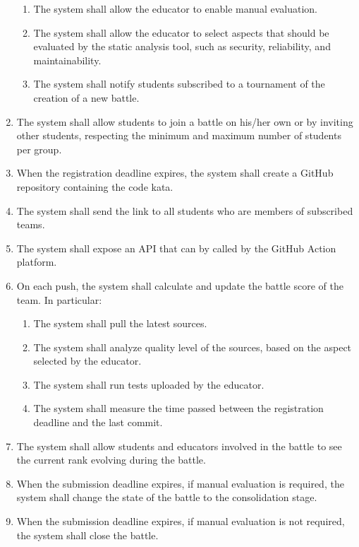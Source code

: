 \begin{enumerate}[label=\textbf{R\arabic*}:,leftmargin=1.3cm]
\begin{enumerate}[label=\textbf{R\arabic{enumi}.\arabic*}:, leftmargin=*]
              \item The system shall allow the educator to enable manual evaluation.
              \item The system shall allow the educator to select aspects that should be evaluated by the static analysis tool, such as security, reliability, and maintainability.
              \item The system shall notify students subscribed to a tournament of the creation of a new battle.
          \end{enumerate}
    \item The system shall allow students to join a battle on his/her own or by inviting other students, respecting the minimum and maximum number of students per group.
    \item When the registration deadline expires, the system shall create a GitHub repository containing the code kata.
    \item The system shall send the link to all students who are members of subscribed teams.
    \item The system shall expose an API that can by called by the GitHub Action platform.
    \item On each push, the system shall calculate and update the battle score of the team. In particular: 
          \begin{enumerate}[label=\textbf{R\arabic{enumi}.\arabic*}:, leftmargin=*]
              \item The system shall pull the latest sources.
              \item The system shall analyze quality level of the sources, based on the aspect selected by the educator.
              \item The system shall run tests uploaded by the educator.
              \item The system shall measure the time passed between the registration deadline and the last commit.
          \end{enumerate}
    \item The system shall allow students and educators involved in the battle to see the current rank evolving during the battle.
    \item When the submission deadline expires, if manual evaluation is required, the system shall change the state of the battle to the consolidation stage.
    \item When the submission deadline expires, if manual evaluation is not required, the system shall close the battle.

\end{enumerate}
